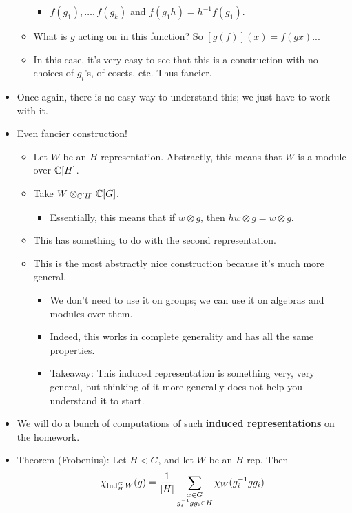 \documentclass[../notes.tex]{subfiles}
\begin{document}
\begin{itemize}
\begin{itemize}
        \begin{itemize}
            \item $f(g_1),\dots,f(g_k)$ and $f(g_1h)=h^{-1}f(g_1)$.
        \end{itemize}
        \item What is $g$ acting on in this function? So $[g(f)](x)=f(gx)$...
        \item In this case, it's very easy to see that this is a construction with no choices of $g_i$'s, of cosets, etc. Thus fancier.
    \end{itemize}
    \item Once again, there is no easy way to understand this; we just have to work with it.
    \item Even fancier construction!
    \begin{itemize}
        \item Let $W$ be an $H$-representation. Abstractly, this means that $W$ is a module over $\mathbb{C}[H]$.
        \item Take $W\otimes_{\mathbb{C}[H]}\mathbb{C}[G]$.
        \begin{itemize}
            \item Essentially, this means that if $w\otimes g$, then $hw\otimes g=w\otimes g$.
        \end{itemize}
        \item This has something to do with the second representation.
        \item This is the most abstractly nice construction because it's much more general.
        \begin{itemize}
            \item We don't need to use it on groups; we can use it on algebras and modules over them.
            \item Indeed, this works in complete generality and has all the same properties.
            \item Takeaway: This induced representation is something very, very general, but thinking of it more generally does not help you understand it to start.
        \end{itemize}
    \end{itemize}
    \item We will do a bunch of computations of such \textbf{induced representations} on the homework.
    \item Theorem (Frobenius): Let $H<G$, and let $W$ be an $H$-rep. Then
    \begin{equation*}
        \chi_{\ind_H^GW}(g) = \frac{1}{|H|}\sum_{\substack{x\in G\\g_i^{-1}gg_i\in H}}\chi_W(g_i^{-1}gg_i)

\end{equation*}
\end{itemize}
\end{document}
